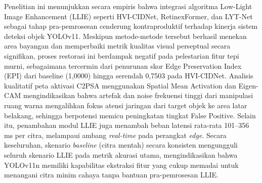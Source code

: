 \documentclass[conference]{IEEEtran}
\begin{document}
Penelitian ini menunjukkan secara empiris bahwa integrasi algoritma Low-Light Image Enhancement (LLIE) seperti HVI-CIDNet, RetinexFormer, dan LYT-Net sebagai tahap pra-pemrosesan cenderung kontraproduktif terhadap kinerja sistem deteksi objek YOLOv11. Meskipun metode-metode tersebut berhasil menekan area bayangan dan memperbaiki metrik kualitas visual perseptual secara signifikan, proses restorasi ini berdampak negatif pada pelestarian fitur tepi murni, sebagaimana tercermin dari penurunan skor Edge Preservation Index (EPI) dari baseline (1,0000) hingga serendah 0,7503 pada HVI-CIDNet. Analisis kualitatif peta aktivasi C2PSA menggunakan Spatial Mean Activation dan Eigen-CAM mengindikasikan bahwa artefak dan noise frekuensi tinggi dari manipulasi ruang warna mengalihkan fokus atensi jaringan dari target objek ke area latar belakang, sehingga berpotensi memicu peningkatan tingkat False Positive. Selain itu, penambahan modul LLIE juga menambah beban latensi rata-rata 101–356 ms per citra, melampaui ambang \textit{real-time} pada perangkat \textit{edge}. Secara keseluruhan, skenario \textit{baseline} (citra mentah) secara konsisten mengungguli seluruh skenario LLIE pada metrik akurasi utama, mengindikasikan bahwa YOLOv11n memiliki kapabilitas ekstraksi fitur yang cukup memadai untuk menangani citra minim cahaya tanpa bantuan pra-pemrosesan LLIE.


\end{document}
